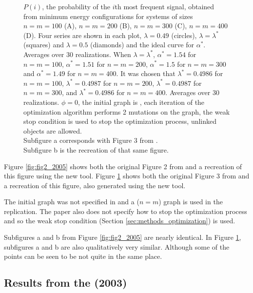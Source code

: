 \begin{figure}
  \caption{
    $P(i)$, the probability of the $i$th most frequent signal, obtained from minimum energy configurations for systems of sizes $n=m=100$ (A), $n=m=200$ (B), $n=m=300$ (C), $n=m=400$ (D).
    Four series are shown in each plot, $\lambda=0.49$ (circles), $\lambda=\lambda^*$ (squares) and $\lambda=0.5$ (diamonds) and the ideal curve for $\alpha^*$.
    Averages over 30 realizations.
    When $\lambda=\lambda^*$, $\alpha^* = 1.54$ for $n=m=100$, $\alpha^* = 1.51$ for $n=m=200$, $\alpha^* = 1.5$ for $n=m=300$ and $\alpha^* = 1.49$ for $n=m=400$.
    It was chosen that $\lambda^* = 0.4986$ for $n=m=100$, $\lambda^* = 0.4987$ for $n=m=200$, $\lambda^* = 0.4987$ for $n=m=300$, and $\lambda^* = 0.4986$ for $n=m=400$.
    Averages over 30 realizations.
    $\phi=0$, the initial graph is , each iteration of the optimization algorithm performs 2 mutations on the graph, the weak stop condition is used to stop the optimization process, unlinked objects are allowed.\\
    Subfigure a corresponds with Figure 3 from \cite{Ferrer2005a}.\\
    Subfigure b is the recreation of that same figure.
  }
  \label{fig:fig3_2005}
\end{figure}

Figure \ref{fig:fig2_2005} shows both the original Figure 2 from \cite{Ferrer2005a} and a recreation of this figure using the new tool.
Figure \ref{fig:fig3_2005} shows both the original Figure 3 from \cite{Ferrer2005a} and a recreation of this figure, also generated using the new tool.

The initial graph was not specified in \cite{Ferrer2005a} and a  ($n=m$) graph is used in the replication.
The paper also does not specify how to stop the optimization process and so the weak stop condition (Section \ref{sec:methods_optimization}) is used.

Subfigures a and b from Figure \ref{fig:fig2_2005} are nearly identical.
In Figure \ref{fig:fig3_2005}, subfigures a and b are also qualitatively very similar.
Although some of the points can be seen to be not quite in the same place.

\subsection{Results from the \secondmodel{} (2003)}
\label{sec:results_verification_second}

